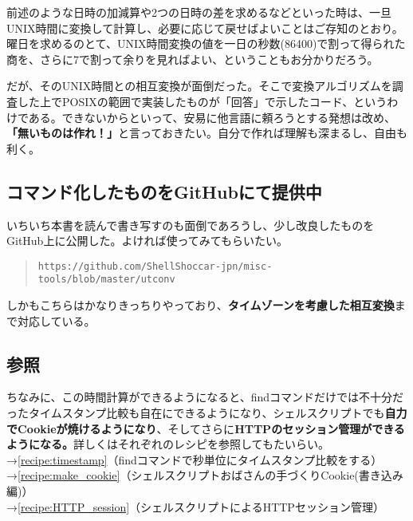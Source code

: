 前述のような日時の加減算や2つの日時の差を求めるなどといった時は、一旦UNIX時間に変換して計算し、必要に応じて戻せばよいことはご存知のとおり。曜日を求めるのとて、UNIX時間変換の値を一日の秒数(86400)で割って得られた商を、さらに7で割って余りを見ればよい、ということもお分かりだろう。

だが、そのUNIX時間との相互変換が面倒だった。そこで変換アルゴリズムを調査した上でPOSIXの範囲で実装したものが「回答」で示したコード、というわけである。できないからといって、安易に他言語に頼ろうとする発想は改め、\textbf{「無いものは作れ！」}と言っておきたい。自分で作れば理解も深まるし、自由も利く。

\subsection*{コマンド化したものをGitHubにて提供中}

いちいち本書を読んで書き写すのも面倒であろうし、少し改良したものをGitHub上に公開した。よければ使ってみてもらいたい。

\begin{quote}
	\verb|https://github.com/ShellShoccar-jpn/misc-tools/blob/master/utconv|
\end{quote}

しかもこちらはかなりきっちりやっており、\textbf{タイムゾーンを考慮した相互変換}まで対応している。

\subsection*{参照}

ちなみに、この時間計算ができるようになると、findコマンドだけでは不十分だったタイムスタンプ比較も自在にできるようになり、シェルスクリプトでも\textbf{自力でCookieが焼けるようになり}、そしてさらに\textbf{HTTPのセッション管理ができるようになる。}詳しくはそれぞれのレシピを参照してもたいらい。\\

\noindent
→\ref{recipe:timestamp}（findコマンドで秒単位にタイムスタンプ比較をする）\\
→\ref{recipe:make_cookie}（シェルスクリプトおばさんの手づくりCookie(書き込み編)） \\
→\ref{recipe:HTTP_session}（シェルスクリプトによるHTTPセッション管理）
